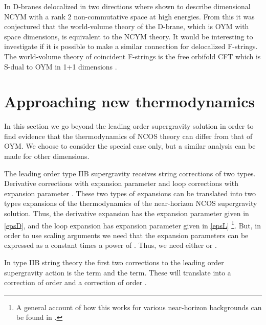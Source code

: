 \documentclass[a4paper,twoside,titlepage,12pt]{article}
\begin{document}
In \cite{Lu:1999rm,Cai:2000hn,Youm:2000ub} 
D\coordHE{}-branes delocalized in two directions
where shown to describe \coordHE{} dimensional 
NCYM with a rank 2 non-commutative space at high energies.
From this it was conjectured that the world-volume theory 
of the D\coordHE{}-brane, which is OYM with \coordHE{} space dimensions,
is equivalent to the NCYM theory.
It would be interesting to investigate if it is possible
to make a similar connection for delocalized F-strings. 
The world-volume theory of \coordHE{} coincident F-strings
is the free orbifold CFT which is S-dual to OYM in 1+1 dimensions
\cite{Dijkgraaf:1997vv}.

\section{Approaching new thermodynamics}
\label{secnewtherm}

In this section we go beyond the leading order supergravity solution
in order to find evidence that the thermodynamics of NCOS theory can differ
from that of OYM. 
We choose to consider the special case \coordHE{} only, 
but a similar analysis can be made for other dimensions.

The leading order type IIB supergravity receives string corrections of
two types. Derivative corrections with expansion parameter 
\coordHE{}
and loop corrections with expansion parameter \coordHE{}. 
These two types of expansions can be translated into two types 
expansions of the thermodynamics of the 
near-horizon NCOS supergravity solution. 
Thus, the derivative expansion has the expansion parameter 
\coordHE{} given in \eqref{epsD}, and the loop expansion
has expansion parameter \coordHE{} given in \eqref{epsL}
\footnote{A general account of how this works for various 
near-horizon backgrounds can be found in \cite{Correia:2000}.}.
But, in order to use scaling arguments we need that the expansion
parameters can be expressed as a constant times a power of \coordHE{}.
Thus, we need either \coordHE{} or \coordHE{}.

In type IIB string theory the first two corrections to the leading
order supergravity action 
is the \coordHE{} term and the \coordHE{}
term. These will translate into a correction of order \coordHE{}
and a correction of order \coordHE{}.
\end{document}
